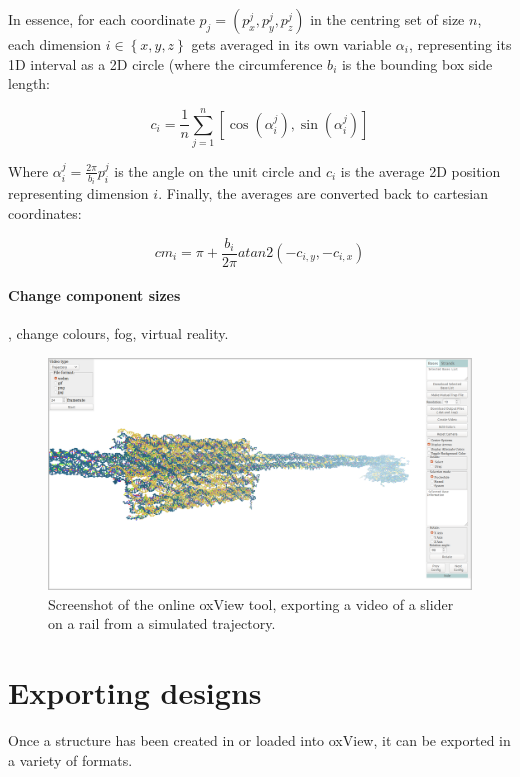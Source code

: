 In essence, for each coordinate \(p_j = \left(p_x^j, p_y^j, p_z^j\right) \) in the centring set of size \(n\), each dimension \(i \in \left\{x,y,z\right\}\) gets averaged in its own variable \(\alpha_i\), representing its 1D interval as a 2D circle (where the circumference \(b_i\) is the bounding box side length:

\[
  c_i = \frac{1}{n} \sum_{j = 1}^{n} \left[ \cos \left( \alpha_i^j \right), \sin \left( \alpha_i^j \right) \right]  
\]

Where \(\alpha_i^j = \frac{2 \pi}{b_i} p_i^j\) is the angle on the unit circle and \(c_i\) is the average 2D position representing dimension \(i\). Finally, the averages are converted back to cartesian coordinates:

\[
  cm_i = \pi + \frac{b_i}{2\pi} atan2(-c_{i,y}, -c_{i, x})
\]

\paragraph{Change component sizes}


, change colours, fog, virtual reality.

\begin{figure}[h]
\centering\includegraphics[width=\textwidth]{figures/oxview.png} 
\caption{Screenshot of the online oxView tool, exporting a video of a slider on a rail from a simulated trajectory.}
\label{fig:oxview}\end{figure}

\section{Exporting designs}
\label{sec:oxdna_export}
Once a structure has been created in or loaded into oxView, it can be exported in a variety of formats.

